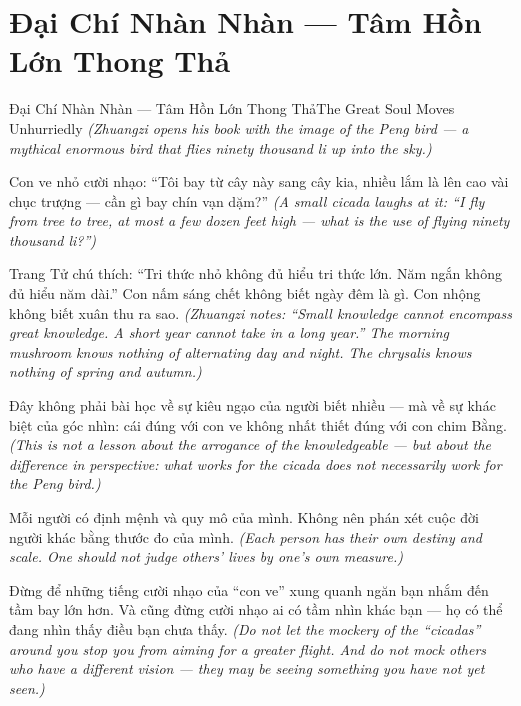 \section{Đại Chí Nhàn Nhàn — Tâm Hồn Lớn Thong Thả}
\begin{truyen}{Đại Chí Nhàn Nhàn — Tâm Hồn Lớn Thong Thả}{The Great Soul Moves Unhurriedly}
\textit{(Zhuangzi opens his book with the image of the Peng bird — a mythical enormous bird that flies ninety thousand li up into the sky.)}

Con ve nhỏ cười nhạo: ``Tôi bay từ cây này sang cây kia, nhiều lắm là lên cao vài chục trượng — cần gì bay chín vạn dặm?''
\textit{(A small cicada laughs at it: ``I fly from tree to tree, at most a few dozen feet high — what is the use of flying ninety thousand li?'')}

Trang Tử chú thích: ``Tri thức nhỏ không đủ hiểu tri thức lớn. Năm ngắn không đủ hiểu năm dài.'' Con nấm sáng chết không biết ngày đêm là gì. Con nhộng không biết xuân thu ra sao.
\textit{(Zhuangzi notes: ``Small knowledge cannot encompass great knowledge. A short year cannot take in a long year.'' The morning mushroom knows nothing of alternating day and night. The chrysalis knows nothing of spring and autumn.)}

Đây không phải bài học về sự kiêu ngạo của người biết nhiều — mà về sự khác biệt của góc nhìn: cái đúng với con ve không nhất thiết đúng với con chim Bằng.
\textit{(This is not a lesson about the arrogance of the knowledgeable — but about the difference in perspective: what works for the cicada does not necessarily work for the Peng bird.)}

Mỗi người có định mệnh và quy mô của mình. Không nên phán xét cuộc đời người khác bằng thước đo của mình.
\textit{(Each person has their own destiny and scale. One should not judge others' lives by one's own measure.)}

\end{truyen}

\begin{baihoc}
Đừng để những tiếng cười nhạo của ``con ve'' xung quanh ngăn bạn nhắm đến tầm bay lớn hơn. Và cũng đừng cười nhạo ai có tầm nhìn khác bạn — họ có thể đang nhìn thấy điều bạn chưa thấy.
\textit{(Do not let the mockery of the ``cicadas'' around you stop you from aiming for a greater flight. And do not mock others who have a different vision — they may be seeing something you have not yet seen.)}
\end{baihoc}
